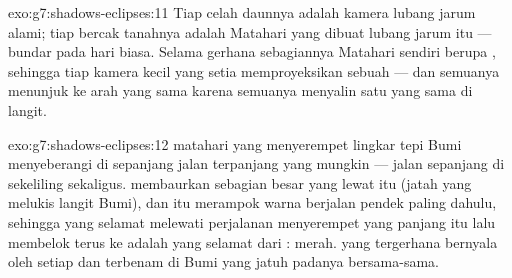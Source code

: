 \begin{solution}{exo:g7:shadows-eclipses:11}
Tiap celah daunnya adalah kamera lubang jarum alami; tiap bercak
tanahnya adalah  Matahari yang dibuat lubang jarum itu ---
bundar pada hari biasa. Selama gerhana sebagiannya Matahari sendiri
berupa , sehingga tiap kamera kecil yang setia memproyeksikan
sebuah  --- dan semuanya menunjuk ke arah yang sama karena
semuanya menyalin satu  yang sama di langit.
\end{solution}

\begin{solution}{exo:g7:shadows-eclipses:12}
 matahari yang menyerempet lingkar tepi Bumi menyeberangi
 di sepanjang jalan terpanjang yang mungkin --- jalan
sepanjang  di sekeliling  sekaligus.
 membaurkan sebagian besar  yang lewat itu (jatah yang
melukis langit Bumi), dan  itu merampok warna berjalan pendek
paling dahulu, sehingga  yang selamat melewati perjalanan
menyerempet yang panjang itu lalu membelok terus ke  adalah yang
selamat dari : merah.  yang tergerhana bernyala
oleh  setiap  dan terbenam di Bumi yang jatuh
padanya bersama-sama.
\end{solution}


